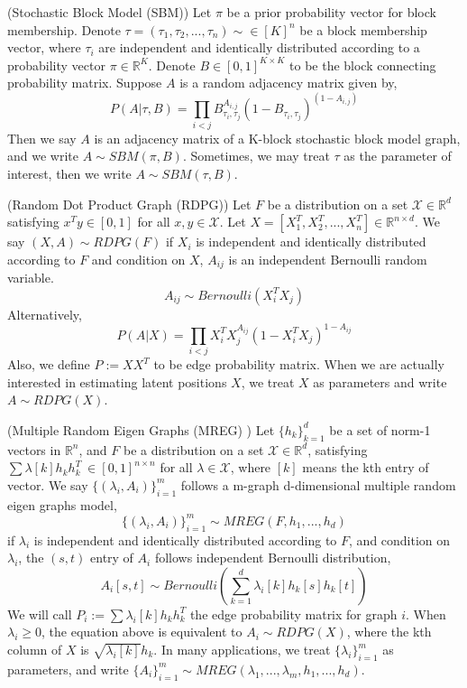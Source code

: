 \documentclass[10pt,journal,compsoc]{IEEEtran}
\newenvironment{definition}[1][Definition]{\begin{trivlist}
		\item[\hskip \labelsep {\bfseries #1}]}{\end{trivlist}}
\begin{document}
\begin{definition} (Stochastic Block Model (SBM)) Let $\pi$ be a prior probability vector for block membership. Denote $\tau=(\tau_1,\tau_2,...,\tau_n) \sim \in [K]^n$ be a block membership vector, where $\tau_i$ are independent and identically distributed according to a probability vector $\pi \in \mathbb{R}^K$. Denote $B \in [0,1]^{K \times K}$ to be the block connecting probability matrix. Suppose $A$ is a random adjacency matrix given by,
\[ P(A|\tau,B)= \prod_{i<j} B_{\tau_i,\tau_j}^{A_{i,j}} (1-B_{\tau_i,\tau_j})^{(1-A_{i,j})}\] 
Then we say $A$ is an adjacency matrix of a K-block stochastic block model graph, and we write $A \sim SBM(\pi,B)$. Sometimes, we may treat $\tau$ as the parameter of interest, then we write $A \sim SBM(\tau,B)$.
\end{definition}

\begin{definition} (Random Dot Product Graph (RDPG)) Let $F$ be a distribution on a set $\mathcal{X} \in \mathbb{R}^d$ satisfying $x^T y \in [0, 1]$ for all $x, y \in \mathcal{X}$. Let $X=[X_1^T,X_2^T,...,X_n^T] \in \mathbb{R}^{n \times d}$. We say $(X,A) \sim RDPG(F)$ if $X_i$ is independent and identically distributed according to $F$ and condition on $X$, $A_{ij}$ is an independent Bernoulli random variable.
\[ A_{ij} \sim Bernoulli(X_i^T X_j) \]
Alternatively,
\[ P(A|X) = \prod_{i<j} X_i^T X_j ^{ A_{ij}} (1-X_i^T X_j)^{1- A_{ij}}\]
Also, we define $P:=XX^T$ to be edge probability matrix. When we are actually interested in estimating latent positions $X$, we treat $X$ as parameters and write $A \sim RDPG(X)$.
\end{definition}

\begin{definition} (Multiple Random Eigen Graphs (MREG) ) Let $\{h_k\}_{k=1}^{d}$ be a set of norm-1 vectors in $\mathbb{R}^{n}$, and  $F$ be a distribution on a set $\mathcal{X} \in \mathbb{R}^d$,  satisfying $\sum \lambda [k] h_k  h_k^T \  \in [0, 1]^{n \times n} $ for all $\lambda \in \mathcal{X}$, where $[k]$ means the kth entry of vector. We say $\{(\lambda_i,A_i)\}_{i=1}^{m}$ follows a m-graph d-dimensional multiple random eigen graphs model,
\[\{(\lambda_i,A_i)\}_{i=1}^{m} \sim MREG(F,h_1,...,h_d)\]
if $\lambda_i$ is independent and identically distributed according to $F$, and condition on $\lambda_i$, the $(s,t)$ entry of $A_i$ follows independent Bernoulli distribution,
\[ A_{i}[s,t] \sim Bernoulli( \sum_{k=1}^{d} \lambda_{i}[k] h_{k} [s] h_{k} [t] ) \]
  We will call $P_i:=\sum \lambda_i [k] h_k  h_k^T$ the edge probability matrix for graph $i$. When $\lambda_{i} \geq 0$, the equation above is equivalent to $A_i \sim RDPG(X)$, where the kth column of $X$ is $\sqrt{\lambda_{i}[k]}h_k$. In many applications, we treat $\{\lambda_i\}_{i=1}^m$ as parameters, and write $\{A_i\}_{i=1}^{m} \sim MREG(\lambda_1,...,\lambda_m,h_1,...,h_d)$. 
\end{definition}
\end{document}
